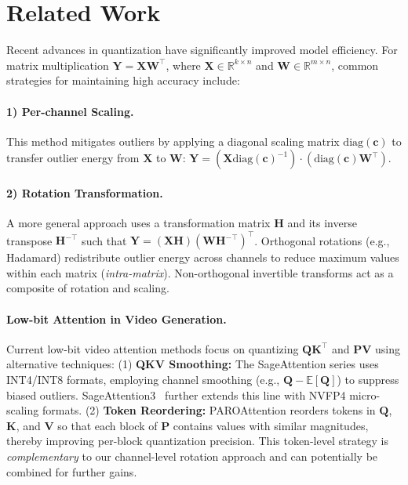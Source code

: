

\section{Related Work}
\label{sec:relate}

Recent advances in quantization \cite{dettmers2022gpt3int8, frantar2022gptq, lin2023awq, li2024svdquant, van2025fptquant, tao2025plug, li2025mbq, li2024evaluating, zhao2025viditq, shang2023post, li2023q, zhao2024mixdq, lin2024duquant, huang2025qvgen,tang2024post,liu2024eda,sui2024bitsfusion} have significantly improved model efficiency. For matrix multiplication $\mathbf{Y} = \mathbf{X}\mathbf{W}^\top$, where $\mathbf{X} \in \mathbb{R}^{k \times n}$ and $\mathbf{W} \in \mathbb{R}^{m \times n}$, common strategies for maintaining high accuracy include:


\paragraph{1) Per-channel Scaling.} This method\cite{xiao2022smoothquant} mitigates outliers by applying a diagonal scaling matrix $\text{diag}(\mathbf{c})$ to transfer outlier energy from $\mathbf{X}$ to $\mathbf{W}$: $\mathbf{Y} = (\mathbf{X} \text{diag}(\mathbf{c})^{-1}) \cdot (\text{diag}(\mathbf{c})\mathbf{W}^\top)$.

\paragraph{2) Rotation Transformation.} A more general approach uses a transformation matrix $\mathbf{H}$ and its inverse transpose $\mathbf{H}^{-\top}$ such that $\mathbf{Y} = (\mathbf{X}\mathbf{H})(\mathbf{W}\mathbf{H}^{-\top})^\top$. Orthogonal rotations (e.g., Hadamard)\cite{ashkboos2024quarot} redistribute outlier energy across channels to reduce maximum values within each matrix (\textit{intra-matrix}). Non-orthogonal invertible transforms act as a composite of rotation and scaling.

\paragraph{\textbf{Low-bit Attention in Video Generation.}} Current low-bit video attention methods focus on quantizing $\mathbf{Q}\mathbf{K}^\top$ and $\mathbf{P}\mathbf{V}$ using alternative techniques:
(1) \textbf{QKV Smoothing:} The SageAttention series \cite{zhang2025sageattention1, zhang2025sageattention2} uses INT4/INT8 formats, employing channel smoothing (e.g., $\mathbf{Q} - \mathbb{E}[\mathbf{Q}]$) to suppress biased outliers. SageAttention3~\cite{zhang2025sageattention3} further extends this line with NVFP4 micro-scaling formats.
(2) \textbf{Token Reordering:} PAROAttention \cite{zhao2025paroattention} reorders tokens in $\mathbf{Q}$, $\mathbf{K}$, and $\mathbf{V}$ so that each block of $\mathbf{P}$ contains values with similar magnitudes, thereby improving per-block quantization precision. This token-level strategy is \emph{complementary} to our channel-level rotation approach and can potentially be combined for further gains.



